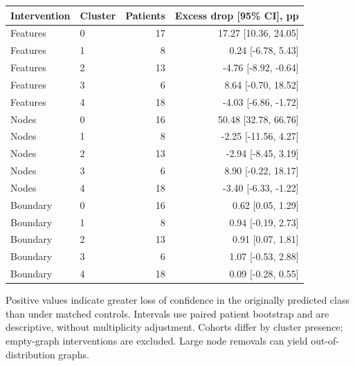 \begin{center}\small\begin{tabular}{llrr} Intervention & Cluster & Patients & Excess drop [95\% CI], pp \\\hline

Features & 0 & 17 & 17.27 [10.36, 24.05] \\

Features & 1 & 8 & 0.24 [-6.78, 5.43] \\

Features & 2 & 13 & -4.76 [-8.92, -0.64] \\

Features & 3 & 6 & 8.64 [-0.70, 18.52] \\

Features & 4 & 18 & -4.03 [-6.86, -1.72] \\

Nodes & 0 & 16 & 50.48 [32.78, 66.76] \\

Nodes & 1 & 8 & -2.25 [-11.56, 4.27] \\

Nodes & 2 & 13 & -2.94 [-8.45, 3.19] \\

Nodes & 3 & 6 & 8.90 [-0.22, 18.17] \\

Nodes & 4 & 18 & -3.40 [-6.33, -1.22] \\

Boundary & 0 & 16 & 0.62 [0.05, 1.29] \\

Boundary & 1 & 8 & 0.94 [-0.19, 2.73] \\

Boundary & 2 & 13 & 0.91 [0.07, 1.81] \\

Boundary & 3 & 6 & 1.07 [-0.53, 2.88] \\

Boundary & 4 & 18 & 0.09 [-0.28, 0.55] \\

\end{tabular}\end{center}

Positive values indicate greater loss of confidence in the originally predicted class than under matched controls. Intervals use paired patient bootstrap and are descriptive, without multiplicity adjustment. Cohorts differ by cluster presence; empty-graph interventions are excluded. Large node removals can yield out-of-distribution graphs.

